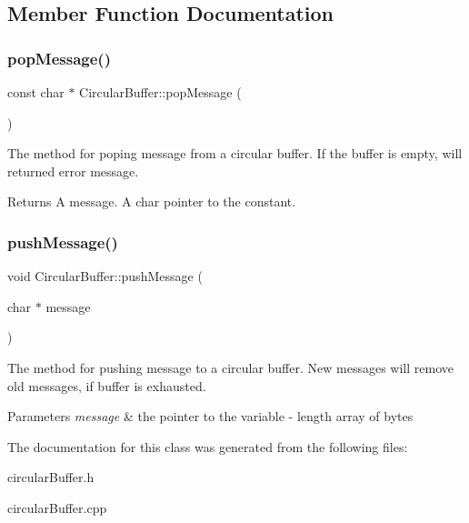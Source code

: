 \subsection{Member Function Documentation}
\mbox{\label{classCircularBuffer_a1f3e0cad472e639cae523adc485b9454}} 
\subsubsection{\texorpdfstring{pop\+Message()}{popMessage()}}
{\footnotesize\ttfamily const char $\ast$ Circular\+Buffer\+::pop\+Message (\begin{DoxyParamCaption}{ }\end{DoxyParamCaption})}

The method for poping message from a circular buffer. If the buffer is empty, will returned error message. \begin{DoxyReturn}{Returns}
A message. A char pointer to the constant. 
\end{DoxyReturn}
\mbox{\label{classCircularBuffer_a581f918b98d088089f4db7c26c89860a}} 
\subsubsection{\texorpdfstring{push\+Message()}{pushMessage()}}
{\footnotesize\ttfamily void Circular\+Buffer\+::push\+Message (\begin{DoxyParamCaption}\item[{char $\ast$}]{message }\end{DoxyParamCaption})}

The method for pushing message to a circular buffer. New messages will remove old messages, if buffer is exhausted. 
\begin{DoxyParams}{Parameters}
{\em message} & the pointer to the variable -\/ length array of bytes \\
\hline
\end{DoxyParams}


The documentation for this class was generated from the following files\+:\begin{DoxyCompactItemize}
\item 
circular\+Buffer.\+h\item 
circular\+Buffer.\+cpp\end{DoxyCompactItemize}

